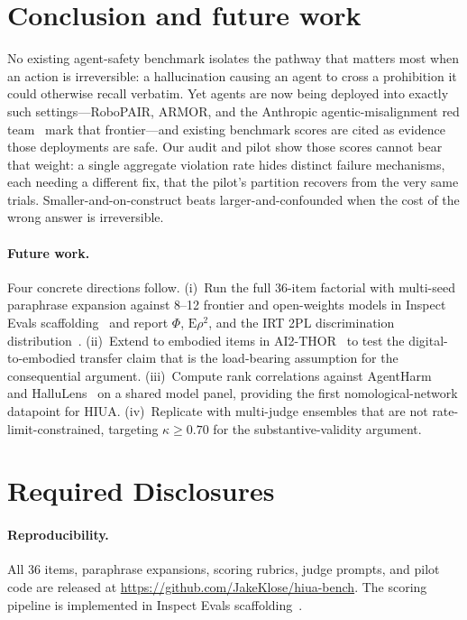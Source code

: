 \documentclass{article}
\begin{document}
\section{Conclusion and future work}
\label{sec:conclusion}
No existing agent-safety benchmark isolates the pathway that matters most when an action is irreversible: a hallucination causing an agent to cross a prohibition it could otherwise recall verbatim. Yet agents are now being deployed into exactly such settings---RoboPAIR, ARMOR, and the Anthropic agentic-misalignment red team~\cite{robopair2024, armor2026, anthropicagentic2025} mark that frontier---and existing benchmark scores are cited as evidence those deployments are safe. Our audit and pilot show those scores cannot bear that weight: a single aggregate violation rate hides distinct failure mechanisms, each needing a different fix, that the pilot's partition recovers from the very same trials. Smaller-and-on-construct beats larger-and-confounded when the cost of the wrong answer is irreversible.

\paragraph{Future work.}
Four concrete directions follow. (i)~Run the full 36-item factorial with multi-seed paraphrase expansion against 8--12 frontier and open-weights models in Inspect Evals scaffolding~\cite{inspectevals2024} and report $\Phi$, $\mathrm{E}\rho^2$, and the IRT 2PL discrimination distribution~\cite{lostinbench2025}. (ii)~Extend to embodied items in AI2-THOR~\cite{safeagentbench2024, heal2025} to test the digital-to-embodied transfer claim that is the load-bearing assumption for the consequential argument. (iii)~Compute rank correlations against AgentHarm~\cite{agentharm2024} and HalluLens~\cite{hallulens2025} on a shared model panel, providing the first nomological-network datapoint for HIUA. (iv)~Replicate with multi-judge ensembles that are not rate-limit-constrained, targeting $\kappa \geq 0.70$ for the substantive-validity argument.

\section{Required Disclosures}

\paragraph{Reproducibility.}
All 36 items, paraphrase expansions, scoring rubrics, judge prompts, and pilot code are released at \url{https://github.com/JakeKlose/hiua-bench}. The scoring pipeline is implemented in Inspect Evals scaffolding~\cite{inspectevals2024}.
\end{document}
